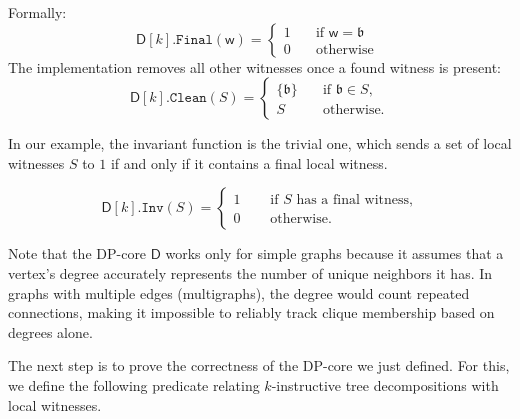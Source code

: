 \documentclass[11pt,a4paper]{article}
\newcommand{\treewidthvalue}{k}
\newcommand{\finalwitnessgeneric}{\mathtt{Final}}
\newcommand{\cleaningfunctioncore}{\mathtt{Clean}}
\newcommand{\awitness}{\mathsf{w}}
\newcommand{\dpcore}{\mathsf{D}}
\newcommand{\witnessset}{S}
\newcommand{\invariantCore}{\mathtt{Inv}}
\newcommand{\cliquefound}{\mathfrak{b}}
\begin{document}
{	Formally:
	\[ \dpcore[\treewidthvalue].\finalwitnessgeneric(\awitness) = \begin{cases}
			1 & \quad \text{if } \awitness = \cliquefound  \\
			0 & \quad \text{otherwise }
		\end{cases}
	\]
			 The implementation removes all other witnesses once a found witness is present:
			\[
			\dpcore[\treewidthvalue].\cleaningfunctioncore(\witnessset)=
			\begin{cases}
			\{\cliquefound\} & \quad \text{if } \cliquefound\in \witnessset,\\[4pt]
			\witnessset & \quad \text{otherwise.}
			\end{cases}
			\]

	 In our example, the invariant function is the trivial one, which sends a set of local witnesses $\witnessset$ to $1$ if and only if it contains a final local witness.

	\[
		\dpcore[\treewidthvalue].\invariantCore(\witnessset)=
		\begin{cases}
			1 & \quad \text{ if } \witnessset \text{ has a final witness,} \\
			0 & \quad \text{ otherwise.}
		\end{cases}
	\]

    Note that the DP-core $\dpcore$ works only for simple graphs because it assumes that a vertex's degree accurately represents the number of unique neighbors it has. In graphs with multiple edges (multigraphs), the degree would count repeated connections, making it impossible to reliably track clique membership based on degrees alone.


	The next step is to prove the correctness of the DP-core we just defined. For this, we define the following predicate relating $\treewidthvalue$-instructive tree decompositions with local witnesses.


}
\end{document}
